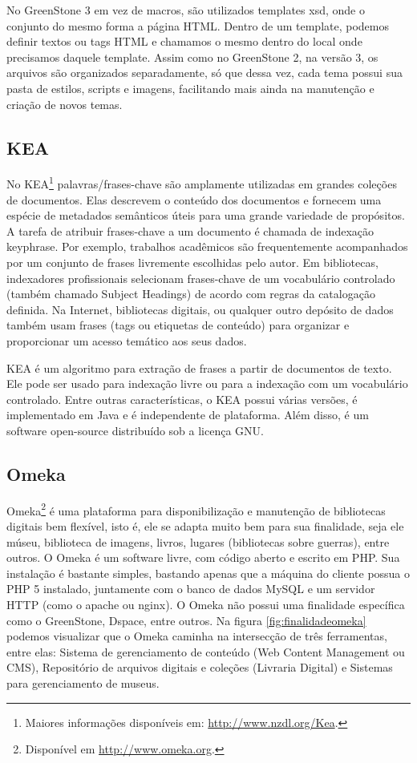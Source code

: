 No GreenStone 3 em vez de macros, são utilizados templates xsd, onde o conjunto do mesmo forma a página HTML. Dentro de um template, podemos definir textos ou tags HTML e chamamos o mesmo dentro do local onde precisamos daquele template. Assim como no GreenStone 2, na versão 3, os arquivos são organizados separadamente, só que dessa vez, cada tema possui sua pasta de estilos, scripts e imagens, facilitando mais ainda na manutenção e criação de novos temas.

\subsection*{KEA}

No KEA\footnote{Maiores informações disponíveis em: \url{http://www.nzdl.org/Kea}.} palavras/frases-chave são amplamente utilizadas em grandes coleções de documentos. Elas descrevem o conteúdo dos documentos e fornecem uma espécie de metadados semânticos úteis para uma grande variedade de propósitos. A tarefa de atribuir frases-chave a um documento é chamada de indexação keyphrase. Por exemplo, trabalhos acadêmicos são frequentemente acompanhados por um conjunto de frases livremente escolhidas pelo autor. Em bibliotecas, indexadores profissionais selecionam frases-chave de um vocabulário controlado (também chamado Subject Headings) de acordo com regras da catalogação definida. Na Internet, bibliotecas digitais, ou qualquer outro depósito de dados também usam frases (tags ou etiquetas de conteúdo) para organizar e proporcionar um acesso temático aos seus dados.

KEA é um algoritmo para extração de frases a partir de documentos de texto. Ele pode ser usado para indexação livre ou para a indexação com um vocabulário controlado. Entre outras características, o KEA possui várias versões, é implementado em Java e é independente de plataforma. Além disso, é um software open-source distribuído sob a licença GNU.

\subsection*{Omeka}

Omeka\footnote{Disponível em \url{http://www.omeka.org}.} é uma plataforma para disponibilização e manutenção de  bibliotecas digitais bem flexível, isto é, ele se adapta muito bem para sua finalidade, seja ele múseu, biblioteca de imagens, livros, lugares (bibliotecas sobre guerras), entre outros. O Omeka é um software livre, com código aberto e escrito em PHP. Sua instalação é bastante simples, bastando apenas que a máquina do cliente possua o PHP 5 instalado, juntamente com o banco de dados MySQL e um servidor HTTP (como o apache ou nginx). O Omeka não possui uma finalidade específica como o GreenStone, Dspace, entre outros. Na figura \ref{fig:finalidadeomeka} podemos visualizar que o Omeka caminha na intersecção de três ferramentas, entre elas: Sistema de gerenciamento de conteúdo (Web Content Management ou CMS), Repositório de arquivos digitais e coleções (Livraria Digital) e Sistemas para gerenciamento de museus.

